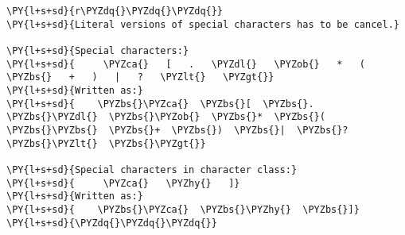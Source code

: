 

\section*{}

\begin{Verbatim}[commandchars=\\\{\}]
\PY{l+s+sd}{r\PYZdq{}\PYZdq{}\PYZdq{}}
\PY{l+s+sd}{Literal versions of special characters has to be cancel.}

\PY{l+s+sd}{Special characters:}
\PY{l+s+sd}{     \PYZca{}   [   .   \PYZdl{}   \PYZob{}   *   (   \PYZbs{}   +   )   |   ?   \PYZlt{}   \PYZgt{}}
\PY{l+s+sd}{Written as:}
\PY{l+s+sd}{    \PYZbs{}\PYZca{}  \PYZbs{}[  \PYZbs{}.  \PYZbs{}\PYZdl{}  \PYZbs{}\PYZob{}  \PYZbs{}*  \PYZbs{}(  \PYZbs{}\PYZbs{}  \PYZbs{}+  \PYZbs{})  \PYZbs{}|  \PYZbs{}?  \PYZbs{}\PYZlt{}  \PYZbs{}\PYZgt{}}

\PY{l+s+sd}{Special characters in character class:}
\PY{l+s+sd}{     \PYZca{}   \PYZhy{}   ]}
\PY{l+s+sd}{Written as:}
\PY{l+s+sd}{    \PYZbs{}\PYZca{}  \PYZbs{}\PYZhy{}  \PYZbs{}]}
\PY{l+s+sd}{\PYZdq{}\PYZdq{}\PYZdq{}}
\end{Verbatim}

